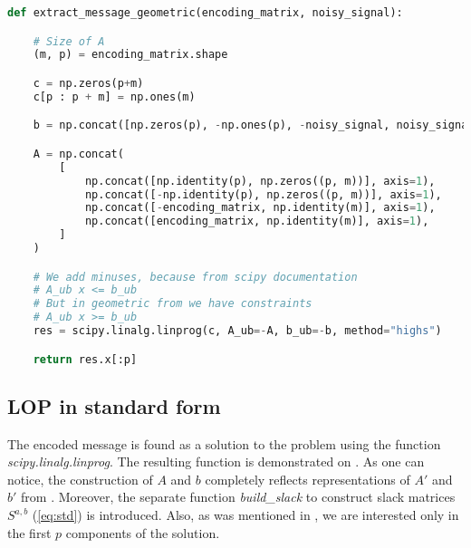 \documentclass{article}
\begin{document}
\begin{lstlisting}[language=Python, caption={Message decryption based on solution of LOP in geometric form}, label={lst:geom}]
  def extract_message_geometric(encoding_matrix, noisy_signal):

    # Size of A
    (m, p) = encoding_matrix.shape

    c = np.zeros(p+m)
    c[p : p + m] = np.ones(m)

    b = np.concat([np.zeros(p), -np.ones(p), -noisy_signal, noisy_signal])

    A = np.concat(
        [
            np.concat([np.identity(p), np.zeros((p, m))], axis=1),
            np.concat([-np.identity(p), np.zeros((p, m))], axis=1),
            np.concat([-encoding_matrix, np.identity(m)], axis=1),
            np.concat([encoding_matrix, np.identity(m)], axis=1),
        ]
    )

    # We add minuses, because from scipy documentation
    # A_ub x <= b_ub
    # But in geometric from we have constraints
    # A_ub x >= b_ub
    res = scipy.linalg.linprog(c, A_ub=-A, b_ub=-b, method="highs")

    return res.x[:p]
\end{lstlisting}


\subsection{LOP in standard form}
The encoded message is found as a solution to the problem  using the function \textit{scipy.linalg.linprog}. The resulting function is demonstrated on . As one can notice, the construction of $A$ and $b$ completely reflects representations of $A'$ and $b'$ from .
Moreover, the separate function \textit{build\_slack} to construct slack matrices $S^{a,b}$ (\cref{eq:std}) is introduced.
Also, as was mentioned in , we are interested only in the first $p$ components of the solution.
\end{document}
